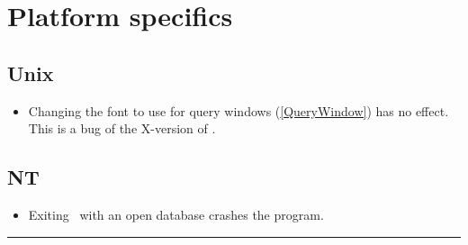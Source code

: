\documentclass[11pt]{article}
\begin{document}
\section{Platform specifics}
\label{Platforms}

\subsection{Unix}

\begin{itemize}
\item
Changing the font to use for query windows (\ref{QueryWindow}) has no effect. This is
a bug of the X-version of \wxwin.
\end{itemize}

\subsection{NT}

\begin{itemize}
\item
Exiting \rview\ with an open database crashes the program.
\end{itemize}


\hrule


\newpage
\end{document}
